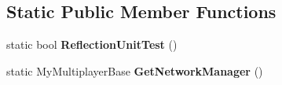 \subsection*{Static Public Member Functions}
\begin{DoxyCompactItemize}
\item 
\hypertarget{class_s_e_mod_a_p_i_internal_1_1_a_p_i_1_1_common_1_1_network_manager_ae3af3e448a065b7ea8db472611bbe491}{}static bool {\bfseries Reflection\+Unit\+Test} ()\label{class_s_e_mod_a_p_i_internal_1_1_a_p_i_1_1_common_1_1_network_manager_ae3af3e448a065b7ea8db472611bbe491}

\item 
\hypertarget{class_s_e_mod_a_p_i_internal_1_1_a_p_i_1_1_common_1_1_network_manager_a67dc50413ba81bf67c506a1a7ce82337}{}static My\+Multiplayer\+Base {\bfseries Get\+Network\+Manager} ()\label{class_s_e_mod_a_p_i_internal_1_1_a_p_i_1_1_common_1_1_network_manager_a67dc50413ba81bf67c506a1a7ce82337}

\end{DoxyCompactItemize}
